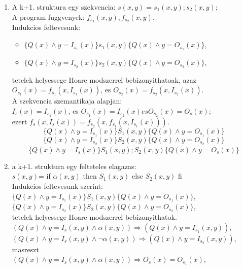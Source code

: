\documentclass[a4paper,10pt]{article}
\begin{document}
\begin{enumerate}
\item A k+1. struktura egy szekvencia: $s(x,y) = s_1(x,y) ; s_2(x,y)$;\\
A program fuggvenyek: $f_{s_1}(x,y), f_{s_2}(x,y)$.\\
Indukcios feltevesunk:
\begin{itemize}
\item $\lbrace Q(x) \wedge y=I_{s_1}(x)\rbrace s_1(x,y) \lbrace Q(x) \wedge y=O_{s_1}(x)\rbrace$,
\item $\lbrace Q(x) \wedge y=I_{s_2}(x)\rbrace s_2(x,y) \lbrace Q(x) \wedge y=O_{s_2}(x)\rbrace$,
\end{itemize}
tetelek helyessege Hoare modszerrel bebizonyithatoak, azaz\\
$O_{s_1}(x)=f_{s_1}(x,I_{s_1}(x))$, es $O_{s_2}(x) = f_{s_2}(x,I_{s_2}(x))$.\\
A szekvencia szemantikaja alapjan:\\
$I_s(x) = I_{s_1}(x)$, es $O_{s_1}(x) = I_{s_2}(x) es O_{s_2}(x) = O_s(x)$;\\
ezert $f_s(x, I_s(x)) = f_{s_2}(x,f_{s_1}(x, I_{s_1}(x)))$.\\
$$\lbrace Q(x)\wedge y=I_{s_1}(x)\rbrace S_1(x,y) \lbrace Q(x)\wedge y=O_{s_1}(x)\rbrace$$
$$\underline{\lbrace Q(x)\wedge y=I_{s_2}(x)\rbrace S_2(x,y) \lbrace Q(x)\wedge y=O_{s_2}(x)\rbrace}$$
$$\lbrace Q(x)\wedge y=I_s(x)\rbrace S_1(x,y);S_2(x,y) \lbrace Q(x)\wedge y=O_s(x)\rbrace$$
\item a k+1. struktura egy felteteles elagazas:\\
$s(x,y)$= if $\alpha(x,y)$ then $S_1(x,y)$ else $S_2(x,y)$ fi\\
Indukcios feltevesunk szerint:\\
$\lbrace Q(x) \wedge y=I_{s_1}(x)\rbrace S_1(x,y) \lbrace Q(x)\wedge y=O_{s_1}(x)\rbrace$,\\
$\lbrace Q(x) \wedge y=I_{s_2}(x)\rbrace S_2(x,y) \lbrace Q(x)\wedge y=O_{s_2}(x)\rbrace$,\\
tetelek helyessege Hoare modszerrel bebizonyithatok.\\
$(Q(x)\wedge y=I_s(x,y) \wedge\alpha(x,y)) \Rightarrow (Q(x)\wedge y=I_{s_1}(x,y))$,\\
$(Q(x)\wedge y=I_s(x,y) \wedge\neg\alpha(x,y)) \Rightarrow (Q(x)\wedge y=I_{s_2}(x,y))$,\\
masreszt\\
$(Q(x)\wedge y=I_s(x,y)\wedge \alpha(x,y)) \Rightarrow O_s(x)=O_{s_1}(x)$,\\

\end{enumerate}
\end{document}
